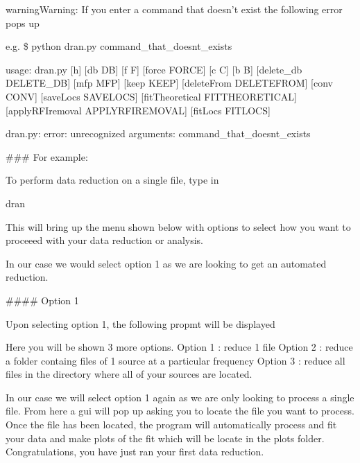 \documentclass[letterpaper,10pt,english]{sphinxmanual}
\begin{document}
\begin{sphinxadmonition}{warning}{Warning:}
\sphinxAtStartPar
If you enter a command that doesn’t exist the following error pops up

\sphinxAtStartPar
e.g. \$ python dran.py command\_that\_doesnt\_exists

\sphinxAtStartPar
usage: dran.py {[}\sphinxhyphen{}h{]} {[}\sphinxhyphen{}db DB{]} {[}\sphinxhyphen{}f F{]} {[}\sphinxhyphen{}force FORCE{]} {[}\sphinxhyphen{}c C{]} {[}\sphinxhyphen{}b B{]}
{[}\sphinxhyphen{}delete\_db DELETE\_DB{]} {[}\sphinxhyphen{}mfp MFP{]} {[}\sphinxhyphen{}keep KEEP{]}
{[}\sphinxhyphen{}deleteFrom DELETEFROM{]} {[}\sphinxhyphen{}conv CONV{]} {[}\sphinxhyphen{}saveLocs SAVELOCS{]}
{[}\sphinxhyphen{}fitTheoretical FITTHEORETICAL{]}
{[}\sphinxhyphen{}applyRFIremoval APPLYRFIREMOVAL{]} {[}\sphinxhyphen{}fitLocs FITLOCS{]}

\sphinxAtStartPar
dran.py: error: unrecognized arguments: command\_that\_doesnt\_exists
\end{sphinxadmonition}

\sphinxAtStartPar
\#\#\# For example:

\sphinxAtStartPar
To perform data reduction on a single file, type in

\sphinxAtStartPar
dran

\sphinxAtStartPar
This will bring up the menu shown below with options to select how you want to proceeed with your data reduction or analysis.

\sphinxAtStartPar
In our case we would select option 1 as we are looking to get an automated reduction.

\sphinxAtStartPar
\#\#\#\# Option 1

\sphinxAtStartPar
Upon selecting option 1, the following propmt will be displayed

\sphinxAtStartPar
Here you will be shown 3 more options.
\sphinxhyphen{} Option 1 : reduce 1 file
\sphinxhyphen{} Option 2 : reduce a folder containg files of 1 source at a particular frequency
\sphinxhyphen{} Option 3 : reduce all files in the directory where all of your sources are located.

\sphinxAtStartPar
In our case we will select option 1 again as we are only looking to process a single file. From here a gui will pop up asking you to locate the file you want to process. Once the file has been located, the program will automatically process and fit your data and make plots of the fit which will be locate in the plots folder. Congratulations, you have just ran your first data reduction.
\end{document}
